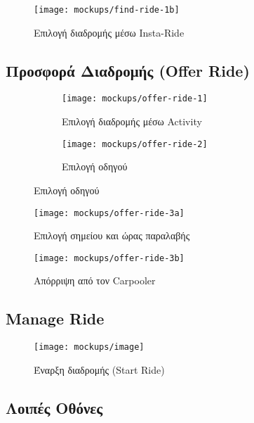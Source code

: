 \newpage

\begin{figure}[H]
    \centering
    \texttt{[image: mockups/find-ride-1b]}
    \caption{Επιλογή διαδρομής μέσω Insta-Ride}
\end{figure}

\newpage

\subsection{Προσφορά Διαδρομής (Offer Ride)}

\begin{figure}[H]
    \centering
    \begin{subfigure}[b]{0.3\textwidth}
        \texttt{[image: mockups/offer-ride-1]}
        \caption{Επιλογή διαδρομής μέσω Activity}
    \end{subfigure}
    \hfill
    \begin{subfigure}[b]{0.3\textwidth}
        \texttt{[image: mockups/offer-ride-2]}
        \caption{Επιλογή οδηγού}
    \end{subfigure}
\end{figure}

\begin{figure}[H]
    \texttt{[image: mockups/offer-ride-3a]}
    \caption{Επιλογή σημείου και ώρας παραλαβής}
\end{figure}

\newpage

\begin{figure}[h!]
    \texttt{[image: mockups/offer-ride-3b]}
    \caption{Απόρριψη από τον Carpooler}
\end{figure}

\newpage

\subsection{Manage Ride}

\begin{figure}[H]
    \texttt{[image: mockups/image]}
    \caption{Έναρξη διαδρομής (Start Ride)}
\end{figure}

\newpage

\subsection{Λοιπές Οθόνες}

